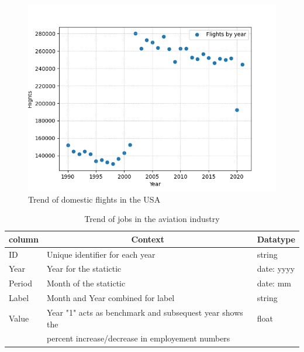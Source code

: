 \documentclass[
  man,floatsintext]{apa7}
\begin{document}
\begin{figure}

{\centering \includegraphics{./graphs/Count of flights} 

}

\caption{Trend of domestic flights in the USA}\label{fig:aviation-flights-image}
\end{figure}

\begin{table}[tbp]

\begin{center}
\begin{threeparttable}

\caption{\label{tab:aviation-jobs-schema}Trend of jobs in the aviation industry}

\begin{tabular}{lll}
\toprule
column & \multicolumn{1}{c}{Context} & \multicolumn{1}{c}{Datatype}\\
\midrule
ID & Unique identifier for each year & string\\
Year & Year for the statictic & date: yyyy\\
Period & Month of the statictic & date: mm\\
Label & Month and Year combined for label & string\\
Value & Year "1" acts as benchmark and subsequest year shows the & float\\
 & percent increase/decrease in employement numbers & \\
\bottomrule
\end{tabular}

\end{threeparttable}
\end{center}

\end{table}
\end{document}
